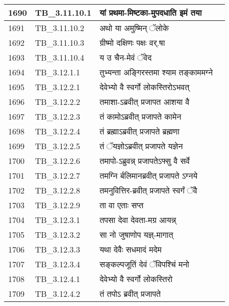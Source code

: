 \documentclass[17pt]{extarticle}
\begin{document}
\begin{longtable}{||p{0.4in}||p{0.9in}||p{4.0in}||p{0.9in}||}
        \hline
            1690 & TB\_3.11.10.1 & यां प्रथमा{-}मिष्टका{-}मुपदधाति इमं तया &      \\
        \hline
            1691 & TB\_3.11.10.2 & अथो या अमुष्मिन् ॅलोके &      \\
        \hline
            1692 & TB\_3.11.10.3 & ग्रीष्मो दक्षिणः पक्षः वर्.षा &      \\
        \hline
            1693 & TB\_3.11.10.4 & य उ चैन{-}मेवं ॅवेद &      \\
        \hline
            1694 & TB\_3.12.1.1 & तुभ्यन्ता अङ्गिरस्तमा श्याम तङ्काममग्ने &      \\
        \hline
            1695 & TB\_3.12.2.1 & देवेभ्यो वै स्वर्गो लोकस्तिरोऽभवत् &      \\
        \hline
            1696 & TB\_3.12.2.2 & तमाशा{-}ऽब्रवीत् प्रजापत आशया वै &      \\
        \hline
            1697 & TB\_3.12.2.3 & तं कामोऽब्रवीत् प्रजापते कामेन &      \\
        \hline
            1698 & TB\_3.12.2.4 & तं ब्रह्माऽब्रवीत् प्रजापते ब्रह्मणा &      \\
        \hline
            1699 & TB\_3.12.2.5 & तं ॅयज्ञोऽब्रवीत् प्रजापते यज्ञेन &      \\
        \hline
            1700 & TB\_3.12.2.6 & तमापो{-}ऽब्रुवन्न् प्रजापतेऽफ्सु वै सर्वे &      \\
        \hline
            1701 & TB\_3.12.2.7 & तमग्नि र्बलिमानब्रवीत् प्रजापते ऽग्नये &      \\
        \hline
            1702 & TB\_3.12.2.8 & तमनुवित्तिर{-}ब्रवीत् प्रजापते स्वर्गं ॅवै &      \\
        \hline
            1703 & TB\_3.12.2.9 & ता वा एताः सप्त &      \\
        \hline
            1704 & TB\_3.12.3.1 & तपसा देवा देवता{-}मग्र आयन्न् &      \\
        \hline
            1705 & TB\_3.12.3.2 & सा नो जुषाणोप यज्ञ्{-}मागात् &      \\
        \hline
            1706 & TB\_3.12.3.3 & यथा देवैः सधमादं मदेम &      \\
        \hline
            1707 & TB\_3.12.3.4 & सङ्कल्पजूतिं देवं ॅविपश्चिं मनो &      \\
        \hline
            1708 & TB\_3.12.4.1 & देवेभ्यो वै स्वर्गो लोकस्तिरो &      \\
        \hline
            1709 & TB\_3.12.4.2 & तं तपोऽ ब्रवीत् प्रजापते &      \\

\end{longtable}
\end{document}
